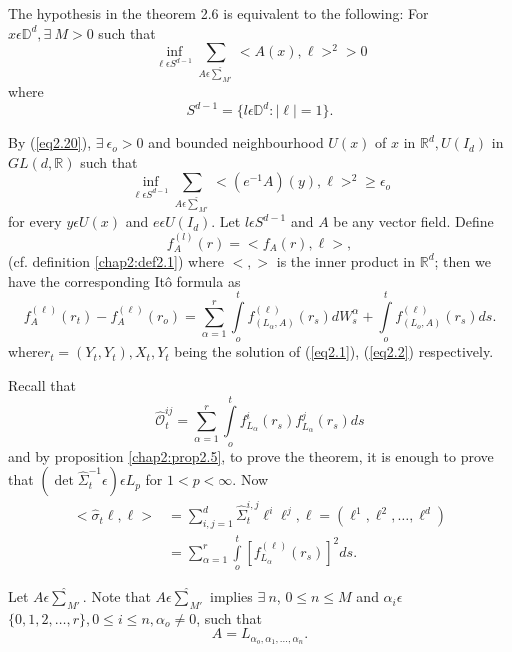 \begin{remark}%
  The hypothesis in the theorem 2.6 is equivalent to
  the following:  For $x \epsilon  \mathbb{D}^d, \exists~ M> 0$ such
  that   
\begin{equation*}
    \inf_{ \ell \epsilon  S^{d-1}} \sum_{A \epsilon  \hat{\sum}_{M'}}<
    A(x), \ell >^2 > 0 \tag{2.20}\label{eq2.20}
\end{equation*}
where
$$
S^{d-1}= \{l \epsilon  \mathbb{D}^d: |\ell| = 1  \}.
$$
\end{remark}

\setcounter{proofoftheorem}{6}
\begin{proofoftheorem}%
  By (\ref{eq2.20}), $\exists~ \epsilon _o > 0$ and bounded neighbourhood
  $U(x)$ of $x$ in $\mathbb{R}^d,U(I_d)$ in $GL(d,\mathbb{R})$ such
  that  
  \begin{equation*}
    \inf_{ \ell \epsilon  S^{d-1}} \sum_{A \epsilon  \hat{\sum}_{M'}}<
  (e^{-1}A)(y), \ell >^2 \geq\epsilon_o  \tag{2.21}\label{eq2.21} 
  \end{equation*}
  for every $y \epsilon  U(x)$ and $e \epsilon  U(I_d)$. Let $l \epsilon 
  S^{d-1}$ and $A$ be any vector field. Define  
  $$
  f^{(l)}_{A} (r) = < f_A (r), \ell>,
  $$
  (cf. definition \ref{chap2:def2.1}) where $<,>$ is the inner product in
  $\mathbb{R}^d$; then we have the corresponding It\^{o} formula
  as  
  $$
  f^{(\ell)}_{A}(r_t) - f^{(\ell)}_{A}(r_o) = \sum^{r}_{\alpha =1}
  \int\limits^ t_o f^{(\ell)}_{(L_{\alpha},A)}(r_s) dW^{\alpha}_s +
  \int\limits^t_o f^{(\ell)}_{(L_{o},A)}(r_s)  ds. 
  $$
where\pageoriginale $r_t = (Y_t,Y_t), X_t,Y_t$ being the solution of
(\ref{eq2.1}), (\ref{eq2.2}) 
respectively. 
\end{proofoftheorem}

Recall that 
$$
\hat{\mathcal{O}}^{ij}_{t}= \sum^r_{\alpha = 1} \int\limits^t_o
f^i_{L_{\alpha}}(r_s) f^j_{L_{\alpha}} (r_s) ds  
$$
and by proposition \ref{chap2:prop2.5}, to prove the theorem, it is
enough to prove that $(\det
\hat{\Sigma}^{-1}_t \epsilon) \epsilon  L_p$ for $1<p< \infty$. Now  
\begin{align*}
  < \hat{\sigma}_t \ell,\ell> & = \sum^d_{i, j=1}\hat{\Sigma}^{i,j}_t
  \ell^i \ell^j, \ell =(\ell^1, \ell^2, \ldots, \ell^d)\\ 
  &= \sum^r_{\alpha = 1} \int\limits^t_o [ f^{(\ell)}_{L_{\alpha}} (r_s)]^2 ds.
\end{align*}

Let $A \epsilon  \hat{\sum}_{M'}$. Note that $A \epsilon 
\hat{\sum}_{M'}$ implies $\exists~ n$, $0 \leq n \leq M$ and $\alpha_i
\epsilon$  $\{ 0,1,2,\ldots,r \}, 0 \leq i \leq n, \alpha_o \neq 0$,
such that  
$$
A = L_{\alpha_o, \alpha_1, \ldots, \alpha_n}.
$$

